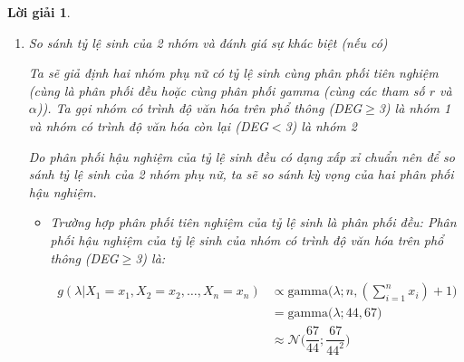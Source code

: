 \documentclass[14pt, a4paper]{article}
\theoremstyle{sltheorem}
\theoremstyle{soltheorem}
\newtheorem*{loigiai}{Lời giải}
\begin{document}
\begin{loigiai}
\begin{enumerate}
\begin{itemize}
\begin{itemize}
\begin{itemize}
                Vậy khoảng tin cậy đối xứng với độ tin cậy 0.95 của tỷ lệ sinh là:

                \begin{equation*}
                    E \lbrack \lambda \rbrack \in \Big( \dfrac{227}{113} - z_{1-\frac{\beta}{2}} \dfrac{\sqrt{227}}{113};\dfrac{227}{113} + z_{1-\frac{\beta}{2}} \dfrac{\sqrt{227}}{113} \Big) 
                \end{equation*}
                
                với $z_{1-\frac{\beta}{2}}=z_{1-0.025}=z_{0.975}\approx1.9599$
                Thay số ta được:
                \begin{equation*}
                    E \lbrack \lambda \rbrack \in \Big( 1.7475; 2.2701 \Big)
                \end{equation*}
                \end{itemize}
        \end{itemize}
    \end{itemize}

    \textbf{Nhận xét}: Ta nhận thấy hai cách ước lượng khoảng tin cậy bằng Credible Interval và ước lượng khoảng tin cậy bằng xấp xỉ chuẩn cho phân phối gamma cho kết quả rất gần nhau.
        
    \item So sánh tỷ lệ sinh của 2 nhóm và đánh giá sự khác biệt (nếu có)
    
    Ta sẽ giả định hai nhóm phụ nữ có tỷ lệ sinh cùng phân phối tiên nghiệm (cùng là phân phối đều hoặc cùng phân phối gamma (cùng các tham số $r$ và $\alpha$)).
    Ta gọi nhóm có trình độ văn hóa trên phổ thông (DEG$\geq$3) là nhóm 1 và nhóm có trình độ văn hóa còn lại (DEG$<$3) là nhóm 2

    Do phân phối hậu nghiệm của tỷ lệ sinh đều có dạng xấp xỉ chuẩn nên để so sánh tỷ lệ sinh của 2 nhóm phụ nữ, ta sẽ so sánh kỳ vọng của hai phân phối hậu nghiệm.
    
    \begin{itemize}
        \item Trường hợp phân phối tiên nghiệm của tỷ lệ sinh là phân phối đều:
        Phân phối hậu nghiệm của tỷ lệ sinh của nhóm có trình độ văn hóa trên phổ thông (DEG$\geq$3) là:

        \begin{equation*}
            \begin{aligned}
                g(\lambda \vert X_1 =x_1, X_2=x_2, \dots, X_n=x_n) &\propto \text{gamma}\big(\lambda; n, (\sum_{i=1}^n x_i) + 1\big) \\
                &= \text{gamma}\big(\lambda; 44, 67\big) \\
                &\approx \mathcal{N} \Big(\dfrac{67}{44}; \dfrac{67}{44^2} \Big)
            \end{aligned}
        \end{equation*}


\end{itemize}
\end{enumerate}
\end{loigiai}
\end{document}
